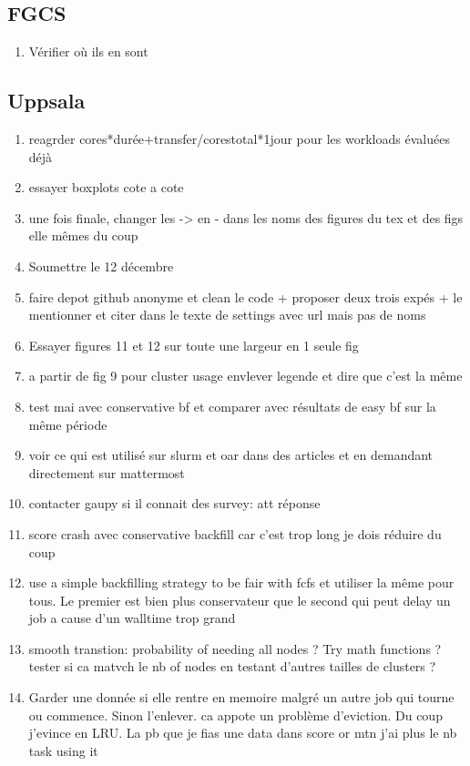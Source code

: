 \documentclass[a4paper]{article}
\begin{document}
	\subsection{FGCS}
		\begin{enumerate}
			\item Vérifier où ils en sont
		\end{enumerate}
	\subsection{Uppsala}
		\begin{enumerate}
			enlever fig de nb de data reuse?
			\item reagrder cores*durée+transfer/corestotal*1jour pour les workloads évaluées déjà
			\item essayer boxplots cote a cote
		
			\item une fois finale, changer les -> en - dans les noms des figures du tex et des figs elle mêmes du coup
			\item Soumettre le 12 décembre
			\item faire depot github anonyme et clean le code + proposer deux trois expés + le mentionner et citer dans le texte de settings avec url mais pas de noms
			\item Essayer figures 11 et 12 sur toute une largeur en 1 seule fig 
			\item a partir de fig 9 pour cluster usage envlever legende et dire que c'est la même



			
			
			
			
			
			
			
			
			
			
			
			\item test mai avec conservative bf et comparer avec résultats de easy bf sur la même période
			\item voir ce qui est utilisé sur slurm et oar dans des articles et en demandant directement sur mattermost
			\item contacter gaupy si il connait des survey: att réponse
			
			\item score crash avec conservative backfill car c'est trop long je dois réduire du coup
		
			\item use a simple backfilling strategy to be fair with fcfs et utiliser la même pour tous. Le premier est bien plus conservateur que le second qui peut delay un job a cause d'un walltime trop grand
			\item smooth transtion: probability of needing all nodes ? Try math functions ? tester si ca matvch le nb of nodes en testant d'autres tailles de clusters ?
			\item Garder une donnée si elle rentre en memoire malgré un autre job qui tourne ou commence. Sinon l'enlever. ca appote un problème d'eviction. Du coup j'evince en LRU. La pb que je fias une data dans score or mtn j'ai plus le nb task using it
		

\end{enumerate}
\end{document}
